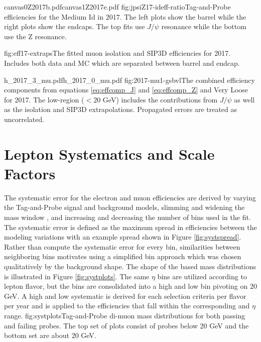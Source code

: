 %
           {canvas0Z2017b.pdf}{canvas1Z2017e.pdf}%
          {fig:jpsiZ17-ideff-ratio}{Tag-and-Probe efficiencies for the Medium Id in 2017. The left plots show the barrel while the right plots show the endcaps. The top fits use $J/\psi$ resonance while the bottom use the Z resonance. }

%
          {fig:eff17-extraps}{The fitted muon isolation and SIP3D efficiencies for 2017. Includes both data and MC which are separated between barrel and endcap.  }



		   {h_2017_3_mu.pdf}{h_2017_0_mu.pdf}
		   {fig:2017-mu1-gsbvl}{The combined efficiency components from equations \ref{eq:effcomp_J} and \ref{eq:effcomp_Z} and Very Loose for 2017. The low-\pt region ($<20$ GeV) includes the contributions from $J/\psi$ as well as the isolation and SIP3D extrapolations. Propagated errors are treated as uncorrelated.}

\FloatBarrier
\section{Lepton Systematics and Scale Factors}

The systematic error for the electron and muon efficiencies are derived by varying the Tag-and-Probe signal and background models, slimming and widening the mass window , and increasing and decreasing the number of bins used in the fit. The systematic error is defined as the maximum spread in efficiencies between the modeling variations with an example spread shown in Figure \ref{fig:systspread}.  Rather than compute the systematic error for every bin, similarities between neighboring bins motivates using a simplified bin approach which was chosen qualitatively by the background shape. The shape of the \pt based mass distributions is illustrated in Figure \ref{fig:systplots}. The same $\eta$ bins are utilized according to lepton flavor, but the \pt bins are consolidated into a high and low bin pivoting on $20$ GeV. A high and low systematic is derived for each selection criteria per flavor per year and is applied to the efficiencies that fall within the corresponding \pt and $\eta$ range. 
%
	{fig:systplots}{Tag-and-Probe di-muon mass distributions for both passing and failing probes. The top set of plots consist of probes below 20 GeV and the bottom set are about 20 GeV.}
	


